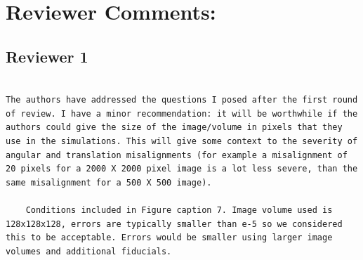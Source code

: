 \documentclass[12pt]{report}
\begin{document}
\section*{Reviewer Comments:}

\subsection*{Reviewer 1}
\begin{lstlisting}

The authors have addressed the questions I posed after the first round of review. I have a minor recommendation: it will be worthwhile if the authors could give the size of the image/volume in pixels that they use in the simulations. This will give some context to the severity of angular and translation misalignments (for example a misalignment of 20 pixels for a 2000 X 2000 pixel image is a lot less severe, than the same misalignment for a 500 X 500 image).
    
    Conditions included in Figure caption 7. Image volume used is 128x128x128, errors are typically smaller than e-5 so we considered this to be acceptable. Errors would be smaller using larger image volumes and additional fiducials.
     
\end{lstlisting}
\end{document}
